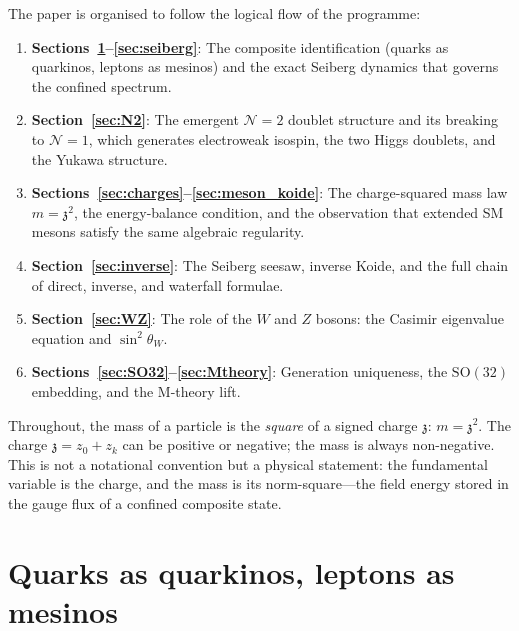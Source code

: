 \documentclass[12pt,a4paper]{article}
\newcommand{\SO}{\mathrm{SO}}
\newcommand{\zch}{\mathfrak{z}}
\begin{document}
The paper is organised to follow the logical flow of the
programme:
\begin{enumerate}
  \item \textbf{Sections~\ref{sec:composites}--\ref{sec:seiberg}}:
    The composite identification (quarks as quarkinos, leptons as
    mesinos) and the exact Seiberg dynamics that governs the
    confined spectrum.

  \item \textbf{Section~\ref{sec:N2}}: The emergent
    $\mathcal{N}{=}2$ doublet structure and its breaking to
    $\mathcal{N}{=}1$, which generates electroweak isospin, the
    two Higgs doublets, and the Yukawa structure.

  \item \textbf{Sections~\ref{sec:charges}--\ref{sec:meson_koide}}:
    The charge-squared mass law $m = \zch^2$, the energy-balance
    condition, and the observation that extended SM mesons
    satisfy the same algebraic regularity.

  \item \textbf{Section~\ref{sec:inverse}}: The Seiberg seesaw,
    inverse Koide, and the full chain of direct, inverse, and
    waterfall formulae.

  \item \textbf{Section~\ref{sec:WZ}}: The role of the $W$ and $Z$
    bosons: the Casimir eigenvalue equation and $\sin^2\theta_W$.

  \item \textbf{Sections~\ref{sec:SO32}--\ref{sec:Mtheory}}:
    Generation uniqueness, the $\SO(32)$ embedding, and the
    M-theory lift.
\end{enumerate}

Throughout, the mass of a particle is the \emph{square} of a
signed charge $\zch$: $m = \zch^2$.
The charge $\zch = z_0 + z_k$ can be positive or negative;
the mass is always non-negative.
This is not a notational convention but a physical statement:
the fundamental variable is the charge, and the mass is its
norm-square---the field energy stored in the gauge flux of a
confined composite state.


\section{Quarks as quarkinos, leptons as mesinos}
\label{sec:composites}
\end{document}
